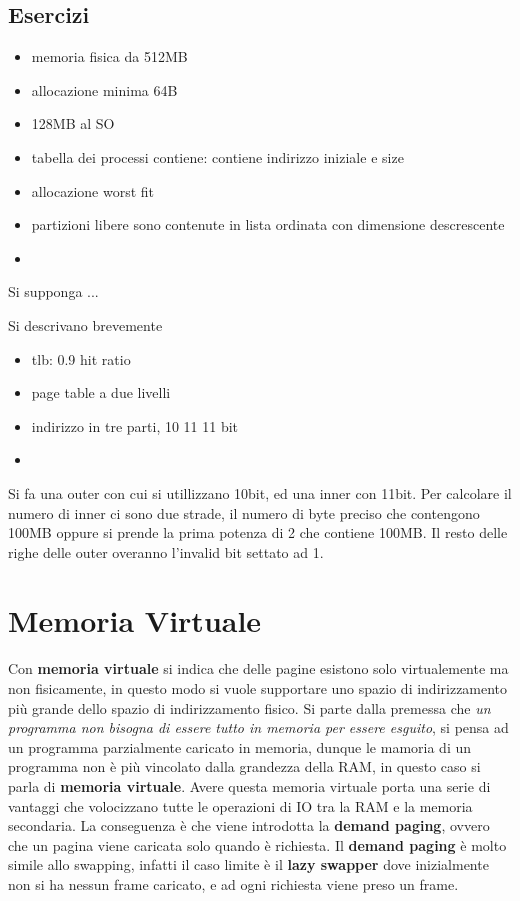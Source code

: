 \documentclass[12pt]{article}
\begin{document}
\subsection{Esercizi}
\begin{example}{}{}
  \begin{itemize}
    \item memoria fisica da 512MB
    \item allocazione minima 64B
    \item 128MB al SO
    \item tabella dei processi contiene: contiene indirizzo iniziale e size
    \item allocazione worst fit
    \item partizioni libere sono contenute in lista ordinata con dimensione descrescente
    \item 
  \end{itemize}
  Si supponga ...
\end{example}
\begin{example}{}{}
  Si descrivano brevemente 
  \begin{itemize}
    \item tlb: 0.9 hit ratio
    \item page table a due livelli
    \item indirizzo in tre parti, 10 11 11 bit
    \item 
  \end{itemize}
  Si fa una outer con cui si utillizzano 10bit, ed una inner con 11bit. Per calcolare il numero di inner ci sono due strade, il numero di byte preciso che contengono 100MB oppure si prende la prima potenza di 2 che contiene 100MB. Il resto delle righe delle outer overanno l'invalid bit settato ad 1.
\end{example}



\newpage
\section{Memoria Virtuale}
Con \textbf{memoria virtuale} si indica che delle pagine esistono solo virtualemente ma non fisicamente, in questo modo si vuole supportare uno spazio di indirizzamento pi\`u grande dello spazio di indirizzamento fisico. Si parte dalla premessa che \emph{un programma non bisogna di essere tutto in memoria per essere esguito}, si pensa ad un programma parzialmente caricato in memoria, dunque le mamoria di un programma non \`e pi\`u vincolato dalla grandezza della RAM, in questo caso si parla di \textbf{memoria virtuale}. Avere questa memoria virtuale porta una serie di vantaggi che volocizzano tutte le operazioni di IO tra la RAM e la memoria secondaria. La conseguenza \`e che viene introdotta la \textbf{demand paging}, ovvero che un pagina viene caricata solo quando \`e richiesta. Il \textbf{demand paging} \`e molto simile allo swapping, infatti il caso limite \`e il \textbf{lazy swapper} dove inizialmente non si ha nessun frame caricato, e ad ogni richiesta viene preso un frame.
\end{document}
